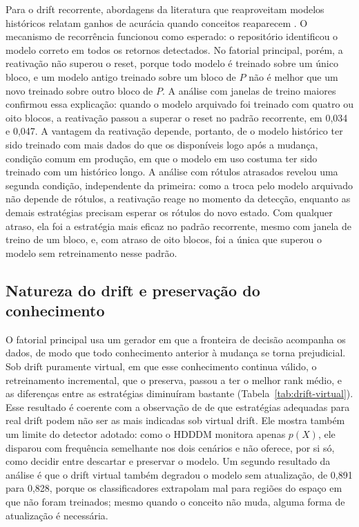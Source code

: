 Para o drift recorrente, abordagens da literatura que reaproveitam modelos
históricos relatam ganhos de acurácia quando conceitos reaparecem
\cite{sun2018,li2021}. O
mecanismo de recorrência funcionou como esperado: o repositório identificou
o modelo correto em todos os retornos detectados. No fatorial principal,
porém, a reativação não superou o reset, porque todo modelo é treinado sobre
um único bloco, e um modelo antigo treinado sobre um bloco de $P$ não é
melhor que um novo treinado sobre outro bloco de $P$. A análise com janelas
de treino maiores confirmou essa explicação: quando o modelo arquivado foi
treinado com quatro ou oito blocos, a reativação passou a superar o reset no
padrão recorrente, em 0,034 e 0,047. A vantagem da reativação depende,
portanto, de o modelo histórico ter sido treinado com mais dados do que os
disponíveis logo após a mudança, condição comum em produção, em que o modelo
em uso costuma ter sido treinado com um histórico longo. A análise com
rótulos atrasados revelou uma segunda condição, independente da primeira:
como a troca pelo modelo arquivado não depende de rótulos, a reativação
reage no momento da detecção, enquanto as demais estratégias precisam
esperar os rótulos do novo estado. Com qualquer atraso, ela foi a estratégia
mais eficaz no padrão recorrente, mesmo com janela de treino de um bloco, e,
com atraso de oito blocos, foi a única que superou o modelo sem
retreinamento nesse padrão.

\subsection{Natureza do drift e preservação do conhecimento}

O fatorial principal usa um gerador em que a fronteira de decisão acompanha
os dados, de modo que todo conhecimento anterior à mudança se torna
prejudicial. Sob drift puramente virtual, em que esse conhecimento continua
válido, o retreinamento incremental, que o preserva, passou a ter o melhor
rank médio, e as diferenças entre as estratégias diminuíram bastante
(Tabela~\ref{tab:drift-virtual}). Esse resultado é coerente com a observação
de  de que estratégias adequadas para real drift
podem não ser as mais indicadas sob virtual drift. Ele mostra também um limite do detector
adotado: como o HDDDM monitora apenas $p(X)$, ele disparou com frequência
semelhante nos dois cenários e não oferece, por si só, como decidir entre
descartar e preservar o modelo. Um segundo resultado da análise é que o
drift virtual também degradou o modelo sem atualização, de 0,891 para 0,828,
porque os classificadores extrapolam mal para regiões do espaço em que não
foram treinados; mesmo quando o conceito não muda, alguma forma de
atualização é necessária.

